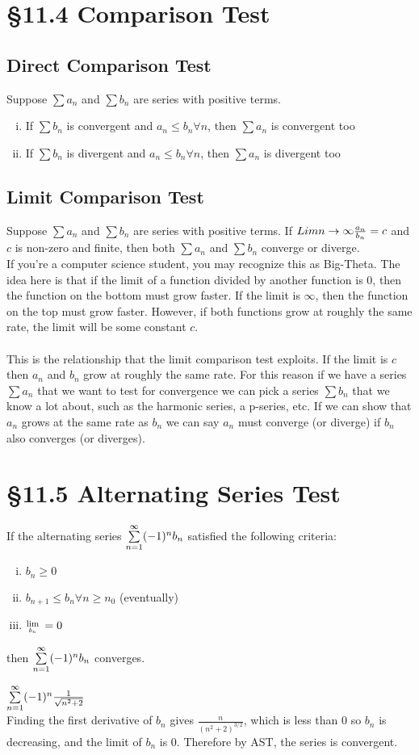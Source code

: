 \documentclass[12 pt]{article}
\begin{document}
	\section{\S 11.4 Comparison Test}
		\subsection{Direct Comparison Test}
		Suppose $\sum a_n$ and $\sum b_n$ are series with positive terms.
		\begin{enumerate}[i)]
			\item If $\sum b_n$ is convergent and $a_n\leq b_n \forall n$, then $\sum a_n$ is convergent too
			\item If $\sum b_n$ is divergent and $a_n\leq b_n \forall n$, then $\sum a_n$ is divergent too
		\end{enumerate}

		\subsection{Limit Comparison Test}
		Suppose $\sum a_n$ and $\sum b_n$ are series with positive terms. If $Lim{n\rightarrow\infty} \frac{a_n}{b_n}=c$ and $c$ is non-zero and finite, then both $\sum a_n$ and $\sum b_n$ converge or diverge.\\

		If you're a computer science student, you may recognize this as Big-Theta. The idea here is that if the limit of a function divided by another function is 0, then the function on the bottom must grow faster. If the limit is $\infty$, then the function on the top must grow faster. However, if both functions grow at roughly the same rate, the limit will be some constant $c$.\\\\ This is the relationship that the limit comparison test exploits. If the limit is $c$ then $a_n$ and $b_n$ grow at roughly the same rate. For this reason if we have a series $\sum a_n$ that we want to test for convergence we can pick a series $\sum b_n$ that we know a lot about, such as the harmonic series, a p-series, etc. If we can show that $a_n$ grows at the same rate as $b_n$ we can say $a_n$ must converge (or diverge) if $b_n$ also converges (or diverges).

	\section{\S 11.5 Alternating Series Test}
		If the alternating series $\sum\limits_{n=1}^{\infty} (-1)^nb_n$ satisfied the following criteria:
		\begin{enumerate}[i)]
			\item $b_n\geq 0$
			\item $b_{n+1}\leq b_n \forall n\geq n_0$ (eventually)
			\item $\Lim{b_n}=0$
		\end{enumerate}
		then $\sum\limits_{n=1}^{\infty} (-1)^nb_n$ converges.
		\begin{exmp*}
			$\sum\limits_{n=1}^{\infty} (-1)^n\frac{1}{\sqrt{n^2+2}}$\\
			Finding the first derivative of $b_n$ gives $\frac{n}{(n^2+2)^{3/2}}$, which is less than 0 so $b_n$ is decreasing, and the limit of $b_n$ is 0. Therefore by AST, the series is convergent.
		\end{exmp*}
\end{document}
